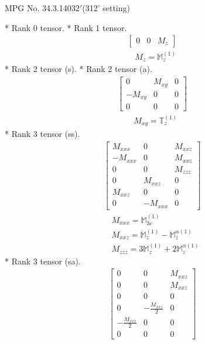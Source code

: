 \documentclass[fleqn,8pt,landscape]{jsarticle}
\begin{document}
\setcounter{MaxMatrixCols}{32}

\renewcommand{\tablename}{Table~}
\renewcommand{\figurename}{Figure~}
\begin{center}
\LARGE
MPG No. 34.3.140\quad$32'$\quad(312' setting)
\end{center}
* Rank 0 tensor.
* Rank 1 tensor.
\begin{align*}
\begin{bmatrix} 0 & 0 & M_{z} \end{bmatrix}
\end{align*}
\begin{align*}
& M_{z} = \mathbb{M}_{z}^{(1)}
\end{align*}
* Rank 2 tensor (s).
* Rank 2 tensor (a).
\begin{align*}
\begin{bmatrix} 0 & M_{xy} & 0 \\ - M_{xy} & 0 & 0 \\ 0 & 0 & 0 \end{bmatrix}
\end{align*}
\begin{align*}
& M_{xy} = \mathbb{T}_{z}^{(1)}
\end{align*}
* Rank 3 tensor (ss).
\begin{align*}
\begin{bmatrix} M_{xxx} & 0 & M_{xxz} \\ - M_{xxx} & 0 & M_{xxz} \\ 0 & 0 & M_{zzz} \\ 0 & M_{xxz} & 0 \\ M_{xxz} & 0 & 0 \\ 0 & - M_{xxx} & 0 \end{bmatrix}
\end{align*}
\begin{align*}
& M_{xxx} = \mathbb{M}_{3c}^{(1)} \\
& M_{xxz} = \mathbb{M}_{z}^{(1)} - \mathbb{M}_{z}^{\alpha(1)} \\
& M_{zzz} = 3 \mathbb{M}_{z}^{(1)} + 2 \mathbb{M}_{z}^{\alpha(1)}
\end{align*}
* Rank 3 tensor (sa).
\begin{align*}
\begin{bmatrix} 0 & 0 & M_{xxz} \\ 0 & 0 & M_{xxz} \\ 0 & 0 & 0 \\ 0 & - \frac{M_{xxz}}{2} & 0 \\ - \frac{M_{xxz}}{2} & 0 & 0 \\ 0 & 0 & 0 \end{bmatrix}
\end{align*}
\end{document}
